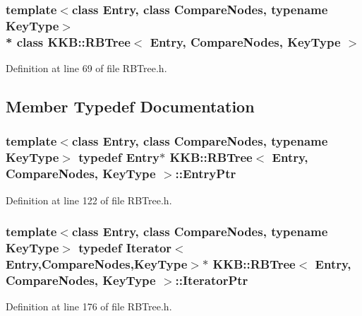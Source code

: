 \subsubsection*{template$<$class Entry, class Compare\+Nodes, typename Key\+Type$>$\\*
class K\+K\+B\+::\+R\+B\+Tree$<$ Entry, Compare\+Nodes, Key\+Type $>$}



Definition at line 69 of file R\+B\+Tree.\+h.



\subsection{Member Typedef Documentation}
\subsubsection[{\texorpdfstring{Entry\+Ptr}{EntryPtr}}]{\setlength{\rightskip}{0pt plus 5cm}template$<$class Entry, class Compare\+Nodes, typename Key\+Type$>$ typedef Entry$\ast$ {\bf K\+K\+B\+::\+R\+B\+Tree}$<$ Entry, Compare\+Nodes, Key\+Type $>$\+::{\bf Entry\+Ptr}}\hypertarget{class_k_k_b_1_1_r_b_tree_a0e7710d8357973338c99b99034b17f33}{}\label{class_k_k_b_1_1_r_b_tree_a0e7710d8357973338c99b99034b17f33}


Definition at line 122 of file R\+B\+Tree.\+h.

\subsubsection[{\texorpdfstring{Iterator\+Ptr}{IteratorPtr}}]{\setlength{\rightskip}{0pt plus 5cm}template$<$class Entry, class Compare\+Nodes, typename Key\+Type$>$ typedef {\bf Iterator}$<$Entry,Compare\+Nodes,Key\+Type$>$$\ast$ {\bf K\+K\+B\+::\+R\+B\+Tree}$<$ Entry, Compare\+Nodes, Key\+Type $>$\+::{\bf Iterator\+Ptr}}\hypertarget{class_k_k_b_1_1_r_b_tree_acc78dafbc3dcd8bc3872e29679bb3ef0}{}\label{class_k_k_b_1_1_r_b_tree_acc78dafbc3dcd8bc3872e29679bb3ef0}


Definition at line 176 of file R\+B\+Tree.\+h.

